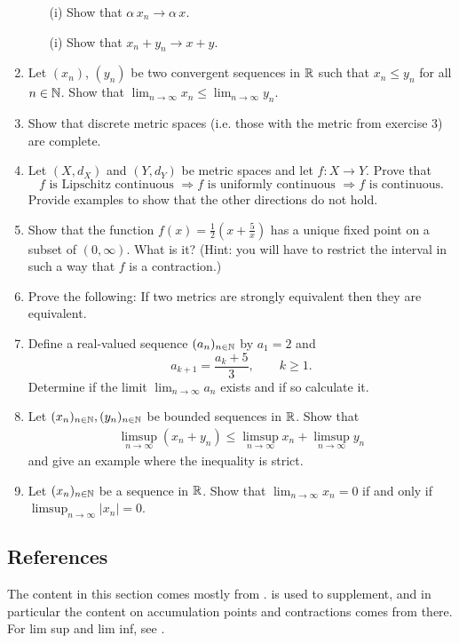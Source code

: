 \documentclass{article}
\begin{document}
\begin{enumerate}
    \begin{enumerate}
        \item[(i)] Show that $\alpha \, x_n \to \alpha \, x$.
        \item[(i)] Show that $x_n + y_n \to x + y$.
    \end{enumerate}
    \item Let $(x_n)$, $(y_n)$ be two convergent sequences in ${\mathbb{R}}$ such that $x_n \leq y_n$ for all $n \in {\mathbb{N}}$. Show that $\lim_{n\to \infty} x_n \leq \lim_{n\to \infty} y_n$.
    \item Show that discrete metric spaces (i.e. those with the metric from exercise 3) are complete. 
    \item Let $(X,d_X)$ and $(Y,d_Y)$ be metric spaces and let $f:X\to Y$. Prove that
$$f \text{ is Lipschitz continuous } \Rightarrow f \text{ is uniformly continuous } \Rightarrow f \text{ is continuous}.$$
Provide examples to show that the other directions do not hold.
    \item Show that the function $f(x) = \frac{1}{2} \left(x + \frac{5}{x} \right)$ has a unique fixed point on a subset of $(0,\infty)$. What is it? (Hint: you will have to restrict the interval in such a way that $f$ is a contraction.)
    \item Prove the following: If two metrics are strongly equivalent then they are equivalent.
    \item Define a real-valued sequence $(a_n)_{n\in {\mathbb{N}}}$ by $a_1 =2$ and 
    \begin{equation*}
        a_{k+1} = \frac{a_k+5}{3}, \qquad k\geq 1.
    \end{equation*}
    Determine if the limit $\lim_{n\to \infty} a_n$ exists and if so calculate it.
    \item Let $(x_n)_{n\in {\mathbb{N}}}, (y_n)_{n\in {\mathbb{N}}}$ be bounded sequences in ${\mathbb{R}}$. Show that 
    \begin{align*}
        \limsup_{n\to \infty} (x_n + y_n) \leq \limsup_{n\to \infty} x_n + \limsup_{n\to \infty} y_n 
    \end{align*}
    and give an example where the inequality is strict. 
    \item Let $(x_n)_{n\in {\mathbb{N}}}$ be a sequence in ${\mathbb{R}}$. Show that $\lim_{n\to \infty} x_n = 0$ if and only if $\limsup_{n\to \infty} \vert x_n\vert = 0$.
\end{enumerate}

\subsection{References}
The content in this section comes mostly from \cite{tastetopology}. \cite{realanalysis} is used to supplement, and in particular the content on accumulation points and contractions comes from there. For lim sup and lim inf, see \cite{BasicAnalysis1}.
\end{document}
